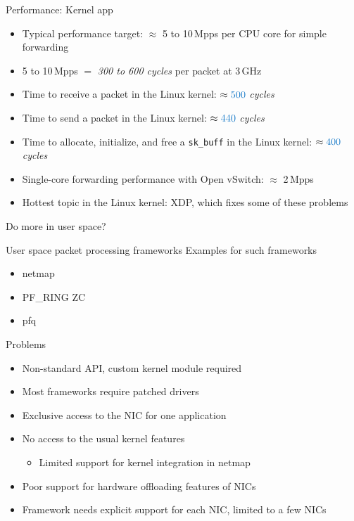 \documentclass[NET,english,aspectratio=169,notitleframe]{tumbeamer}
\begin{document}
\begin{frame}{Performance: Kernel app}
\begin{itemize}
\item<1-> Typical performance target: $\approx$ 5 to 10\,Mpps per CPU core for simple forwarding
\item<1-> 5 to 10\,Mpps $=$ \emph{300 to 600 cycles} per packet at 3\,GHz
\vspace{1em}
\item<2-> Time to receive a packet in the Linux kernel: $\approx \emph{500}$ \emph{cycles}
\item<3-> Time to send a packet in the Linux kernel: $\approx \emph{440}$ \emph{cycles}
\item<4-> Time to allocate, initialize, and free a \texttt{sk\_buff} in the Linux kernel: $\approx \emph{400}$ \emph{cycles}
\vspace{1em}
\item<5-> Single-core forwarding performance with Open vSwitch: $\approx$ 2\,Mpps
\item<5-> Hottest topic in the Linux kernel: XDP, which fixes some of these problems
\end{itemize}
\end{frame}


\begin{frame}{Do more in user space?}
\centering
\end{frame}

\begin{frame}{User space packet processing frameworks}
Examples for such frameworks
\begin{itemize}
\item netmap
\item PF\_RING ZC
\item pfq
\end{itemize}
\end{frame}

\begin{frame}{Problems}
\begin{itemize}
\item Non-standard API, custom kernel module required
\item Most frameworks require patched drivers
\item Exclusive access to the NIC for one application
\item No access to the usual kernel features
\begin{itemize}
\item Limited support for kernel integration in netmap
\end{itemize}
\item Poor support for hardware offloading features of NICs
\item Framework needs explicit support for each NIC, limited to a few NICs
\end{itemize}
\end{frame}
\end{document}
